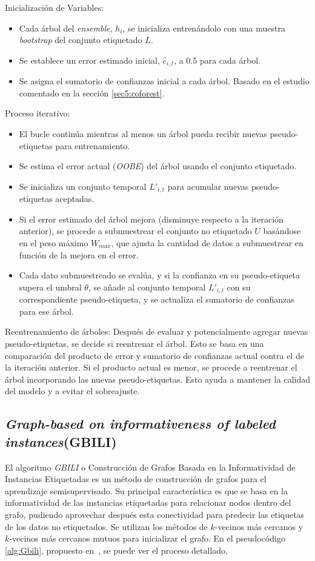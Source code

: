 \clearpage

Inicialización de Variables:
\begin{itemize}
	\item Cada árbol del \textit{ensemble}, $h_i$, se inicializa entrenándolo con una muestra \textit{bootstrap} del conjunto etiquetado $L$.
	\item Se establece un error estimado inicial, $\hat{e}_{i,t}$, a 0.5 para cada árbol.
	\item Se asigna el sumatorio de confianzas inicial a cada árbol. Basado en el estudio comentado en la sección \ref{sec5:coforest}.
\end{itemize}

Proceso iterativo:
\begin{itemize}
	\item El bucle continúa mientras al menos un árbol pueda recibir nuevas pseudo-etiquetas para entrenamiento.
	\item Se estima el error actual (\textit{OOBE}) del árbol usando el conjunto etiquetado.
	\item Se inicializa un conjunto temporal $L'_{i,t}$ para acumular nuevas pseudo-etiquetas aceptadas.
	\item Si el error estimado del árbol mejora (disminuye respecto a la iteración anterior), se procede a submuestrear el conjunto no etiquetado $U$ basándose en el peso máximo $W_{max}$, que ajusta la cantidad de datos a submuestrear en función de la mejora en el error.
	\item Cada dato submuestreado se evalúa, y si la confianza en su pseudo-etiqueta supera el umbral $\theta$, se añade al conjunto temporal $L'_{i,t}$ con su correspondiente pseudo-etiqueta, y se actualiza el sumatorio de confianzas para ese árbol.
\end{itemize}

Reentrenamiento de árboles:
Después de evaluar y potencialmente agregar nuevas pseudo-etiquetas, se decide si reentrenar el árbol. Esto se basa en una comparación del producto de error y sumatorio de confianzas actual contra el de la iteración anterior. Si el producto actual es menor, se procede a reentrenar el árbol incorporando las nuevas pseudo-etiquetas. Esto ayuda a mantener la calidad del modelo y a evitar el sobreajuste.

\subsection{\textit{ Graph-based on informativeness of
labeled instances}(GBILI)}
El algoritmo \textit{GBILI} o Construcción de Grafos Basada en la Informatividad de Instancias Etiquetadas es un método de construcción de grafos para el aprendizaje semisupervisado. Su principal característica es que se basa en la informatividad de las instancias etiquetadas para relacionar nodos dentro del grafo, pudiendo aprovechar después esta conectividad para predecir las etiquetas de los datos no etiquetados. Se utilizan los métodos de $k$-vecinos más cercanos y  $k$-vecinos más cercanos mutuos para inicializar el grafo. En el pseudocódigo \ref{alg:Gbili}, propuesto en~\cite{gbili}, se puede ver el proceso detallado.

